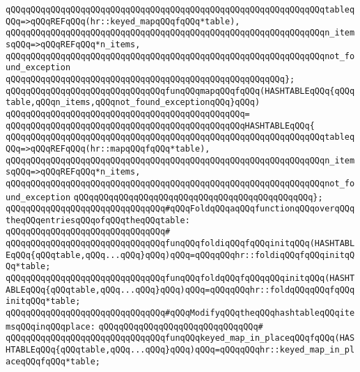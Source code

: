 \verb|qQQqqQQqqQQqqQQqqQQqqQQqqQQqqQQqqQQqqQQqqQQqqQQqqQQqqQQqqQQqqQQqtableqQQq=>qQQqREFqQQq(hr::keyed_mapqQQqfqQQq*table),|\newline
\verb|qQQqqQQqqQQqqQQqqQQqqQQqqQQqqQQqqQQqqQQqqQQqqQQqqQQqqQQqqQQqqQQqn_itemsqQQq=>qQQqREFqQQq*n_items,|\newline
\verb|qQQqqQQqqQQqqQQqqQQqqQQqqQQqqQQqqQQqqQQqqQQqqQQqqQQqqQQqqQQqqQQqnot_found_exception|\newline
\verb|qQQqqQQqqQQqqQQqqQQqqQQqqQQqqQQqqQQqqQQqqQQqqQQqqQQqqQQq};|\newline
\newline
\verb|qQQqqQQqqQQqqQQqqQQqqQQqqQQqqQQqfunqQQqmapqQQqfqQQq(HASHTABLEqQQq{qQQqtable,qQQqn_items,qQQqnot_found_exceptionqQQq}qQQq)|\newline
\verb|qQQqqQQqqQQqqQQqqQQqqQQqqQQqqQQqqQQqqQQqqQQqqQQq=|\newline
\verb|qQQqqQQqqQQqqQQqqQQqqQQqqQQqqQQqqQQqqQQqqQQqqQQqHASHTABLEqQQq{|\newline
\verb|qQQqqQQqqQQqqQQqqQQqqQQqqQQqqQQqqQQqqQQqqQQqqQQqqQQqqQQqqQQqqQQqtableqQQq=>qQQqREFqQQq(hr::mapqQQqfqQQq*table),|\newline
\verb|qQQqqQQqqQQqqQQqqQQqqQQqqQQqqQQqqQQqqQQqqQQqqQQqqQQqqQQqqQQqqQQqn_itemsqQQq=>qQQqREFqQQq*n_items,|\newline
\verb|qQQqqQQqqQQqqQQqqQQqqQQqqQQqqQQqqQQqqQQqqQQqqQQqqQQqqQQqqQQqqQQqnot_found_exception|\newline
\verb|qQQqqQQqqQQqqQQqqQQqqQQqqQQqqQQqqQQqqQQqqQQqqQQq};|\newline
\newline
\verb|qQQqqQQqqQQqqQQqqQQqqQQqqQQqqQQq#qQQqFoldqQQqaqQQqfunctionqQQqoverqQQqtheqQQqentriesqQQqofqQQqtheqQQqtable:|\newline
\verb|qQQqqQQqqQQqqQQqqQQqqQQqqQQqqQQq#|\newline
\verb|qQQqqQQqqQQqqQQqqQQqqQQqqQQqqQQqfunqQQqfoldiqQQqfqQQqinitqQQq(HASHTABLEqQQq{qQQqtable,qQQq...qQQq}qQQq)qQQq=qQQqqQQqhr::foldiqQQqfqQQqinitqQQq*table;|\newline
\verb|qQQqqQQqqQQqqQQqqQQqqQQqqQQqqQQqfunqQQqfoldqQQqfqQQqqQQqinitqQQq(HASHTABLEqQQq{qQQqtable,qQQq...qQQq}qQQq)qQQq=qQQqqQQqhr::foldqQQqqQQqfqQQqinitqQQq*table;|\newline
\newline
\verb|qQQqqQQqqQQqqQQqqQQqqQQqqQQqqQQq#qQQqModifyqQQqtheqQQqhashtableqQQqitemsqQQqinqQQqplace:|\newline
\verb|qQQqqQQqqQQqqQQqqQQqqQQqqQQqqQQq#|\newline
\verb|qQQqqQQqqQQqqQQqqQQqqQQqqQQqqQQqfunqQQqkeyed_map_in_placeqQQqfqQQq(HASHTABLEqQQq{qQQqtable,qQQq...qQQq}qQQq)qQQq=qQQqqQQqhr::keyed_map_in_placeqQQqfqQQq*table;|\newline
